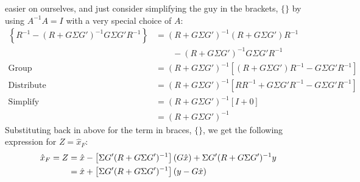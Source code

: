 \documentclass[a4paper,12pt]{article}
\begin{document}
easier on ourselves, and just consider simplifying the guy
in the brackets, $\{\}$ by using
$A^{-1} A = I$ with a very special choice of $A$:
\begin{align*}
    \left\{ R^{-1}  -  (R+ G \Sigma G')^{-1}G\Sigma
	G' R^{-1} \right\}   &=
	(R+ G \Sigma G')^{-1} (R+ G \Sigma G') R^{-1}  \\
    &\qquad -  (R+ G \Sigma G')^{-1}G\Sigma
	G' R^{-1} \\
    \text{Group} \quad &=   (R+ G \Sigma G')^{-1} \left[ (R+ G \Sigma G') R^{-1}
	-  G\Sigma   G' R^{-1}\right] \\
    \text{Distribute} \quad &=   (R+ G \Sigma G')^{-1} \left[ RR^{-1}
	+ G \Sigma G'R^{-1} -  G\Sigma   G' R^{-1}\right] \\
    \text{Simplify} \quad &=   (R+ G \Sigma G')^{-1} \left[ I
	+ 0\right] \\
    &=   (R+ G \Sigma G')^{-1}
\end{align*}
Substituting back in above for the term in braces,
$\{\}$, we get the following expression
for $Z = \hat{x}_F$:
\begin{align}
    \hat{x}_F = Z &= \hat{x}
	- \left[\Sigma G' (R + G \Sigma G')^{-1}  \right]
	\left( G \hat{x} \right)
	+ \Sigma G'  (R+ G \Sigma G')^{-1} y \notag \\
    &= \hat{x}
	+ \left[\Sigma G' (R + G \Sigma G')^{-1}  \right]
	\left( y - G \hat{x} \right)
\end{align}
\end{document}
